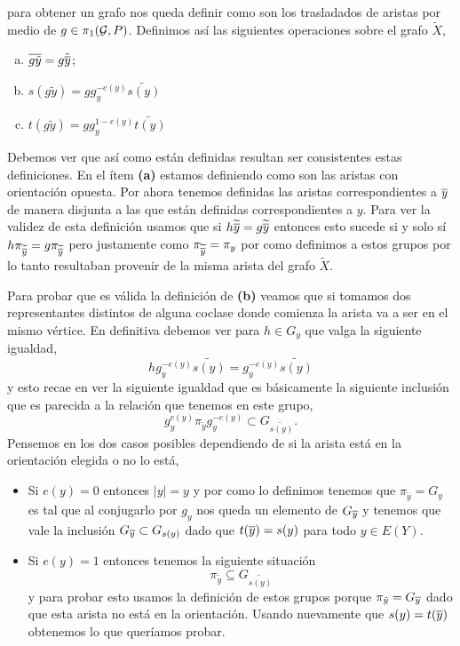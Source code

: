 \documentclass[tesis.tex]{subfiles}
\begin{document}
para obtener un grafo nos queda definir como son los trasladados de aristas por medio de $g \in \pi_1({\cal G}, P)$.
Definimos así las siguientes operaciones sobre el grafo $\tilde X$,
\begin{enumerate}[(a)]
	\item $\overline{g \tilde y} = g \tilde{\overline y}$;
	\item $s(g \tilde y) = g g_y^{-e(y)} \widetilde{s(y)}$
	\item $t(g \tilde y) = g g_y^{1-e(y)} \widetilde{t(y)}$
\end{enumerate}

Debemos ver que así como están definidas resultan ser consistentes estas definiciones.
En el ítem \textbf{(a)} estamos definiendo como son las aristas con orientación opuesta. 
Por ahora tenemos definidas las aristas correspondientes a $\overline y$ de manera disjunta a las que están definidas correspondientes a $y$.
Para ver la validez de esta definición usamos que si $h\widetilde{\overline y} = g\widetilde{\overline y}$ entonces esto sucede si y solo sí $h\pi_{\widetilde{\overline y}} =g\pi_{\widetilde{\overline y}} $ pero justamente como $\pi_{\widetilde{\overline y}} = \pi_{y} $ por como definimos a estos grupos por lo tanto resultaban provenir de la misma arista del grafo $\tilde X$.

Para probar que es válida la definición de \textbf{(b)} veamos que si tomamos dos representantes distintos de alguna coclase donde comienza la arista va a ser en el mismo vértice.
En definitiva debemos ver para $h \in G_y$ que valga la siguiente igualdad,
\[
	hg_y^{-e(y)} \widetilde{s(y)} = g_y^{-e(y)} \widetilde{s(y)}
\] 
y esto recae en ver la siguiente igualdad que es básicamente la siguiente inclusión que es parecida a la relación que tenemos en este grupo,
\[
	g_y^{e(y)}\pi_{\tilde y}g_y^{-e(y)} \subset G_{\widetilde{s(y)}}.
\]
Pensemos en los dos casos posibles dependiendo de si la arista está en la orientación elegida o no lo está,
\begin{itemize}
	\item Si $e(y) = 0$ entonces $|y| = y$ y por como lo definimos tenemos que $\pi_{\tilde y} = G_{y}$ es tal que al conjugarlo por $g_y$ nos queda un elemento de $G_{\overline y}$ y tenemos que vale la inclusión $G_{\overline y} \subset G_{s(y)}$ dado que $t(\overline y) = s(y)$ para todo $y \in E(Y)$.
	\item Si $e(y) = 1$ entonces tenemos la siguiente situación
	\[
		\pi_{\tilde y} \subseteq G_{\widetilde{s(y)}}	
	\] 
	y para probar esto usamos la definición de estos grupos porque $\pi_{\tilde y} = G_{\overline y}$ dado que esta arista no está en la orientación.
	Usando nuevamente que $s(y) = t(\overline y)$ obtenemos lo que queríamos probar.  
\end{itemize}
\end{document}
